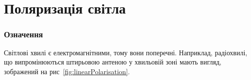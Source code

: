 
\part{Поляризація світла}

\nocite{akhmanov, Godzhaev}
\printbibliography[title={Рекомендована література}, heading=subbibliography]

\section{Означення}

Світлові хвилі є електромагнітними, тому вони поперечні. Наприклад, радіохвилі, що випромінюються штирьовою антеною у хвильовій зоні мають вигляд, зображений на рис~\ref{fig:linearPolarisation}. 

